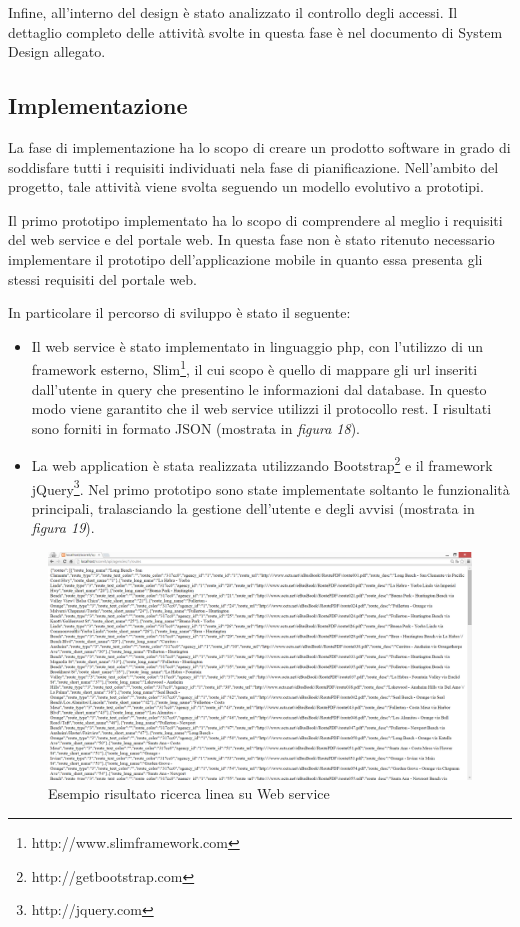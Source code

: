 Infine, all\rq interno del design \`{e} stato analizzato il controllo degli accessi. 
Il dettaglio completo delle attivit\`{a} svolte in questa fase \`{e} nel documento di System Design allegato.

\subsection{Implementazione}
La fase di implementazione ha lo scopo di creare un prodotto software in grado di soddisfare tutti i requisiti individuati nela fase di pianificazione. Nell'ambito del progetto, tale attivit\`{a} viene svolta seguendo un modello evolutivo a prototipi. 

Il primo prototipo implementato ha lo scopo di comprendere al meglio i requisiti del web service e del portale web. In questa fase non \`{e} stato ritenuto necessario implementare il prototipo dell\rq applicazione mobile in quanto essa presenta gli stessi requisiti del portale web. 

In particolare il percorso di sviluppo \`{e} stato il seguente:\\
\begin{itemize}
\item Il web service \`{e} stato implementato in linguaggio php, con l\rq utilizzo di un framework esterno, Slim\footnote{http://www.slimframework.com}, il cui scopo \`{e} quello di mappare gli url inseriti dall\rq utente in query che presentino le informazioni dal database. In questo modo viene garantito che il web service utilizzi il protocollo rest. I risultati sono forniti in formato JSON (mostrata in \emph{figura 18}). \\
\item La web application \`{e} stata realizzata utilizzando Bootstrap\footnote{http://getbootstrap.com} e il framework jQuery\footnote{http://jquery.com}. Nel primo prototipo sono state implementate soltanto le funzionalit\`{a} principali, tralasciando la gestione dell\rq utente e degli avvisi (mostrata in \emph{figura 19}). \\
\end{itemize}

\begin{figure}[tb]
\centering
\includegraphics[scale=.3]{img/19.png}
\caption{Esempio risultato ricerca linea su Web service }
\label{fig:mhs}
\end{figure} 

